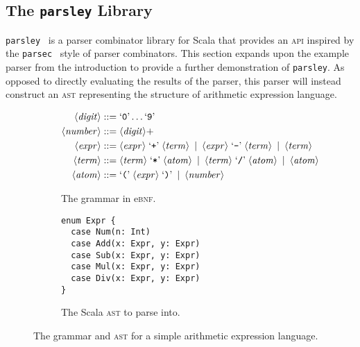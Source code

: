 \documentclass[../../main.tex]{subfiles}
\begin{document}
\subsection{The \texttt{parsley} Library}
\texttt{parsley}~\cite{willis_garnishing_2018} is a parser combinator library for Scala that provides an \textsc{api} inspired by the \texttt{parsec}~\cite{leijen_parsec_2001} style of parser combinators.
This section expands upon the example parser from the introduction to provide a further demonstration of \texttt{parsley}.
As opposed to directly evaluating the results of the parser, this parser will instead construct an \textsc{ast} representing the structure of arithmetic expression language.

\begin{figure}[htbp]
\centering
\begin{subfigure}{0.575\textwidth}
\vspace{3ex}
\centering
\begin{align*}
\langle \mathit{digit} \rangle &::= \text{`\texttt{0}'} \ldots \text{`\texttt{9}'} \\
\langle \mathit{number} \rangle &::= \langle \mathit{digit} \rangle+ \\
\langle \mathit{expr} \rangle &::= \langle \mathit{expr} \rangle \; \text{`\texttt{+}'} \; \langle \mathit{term} \rangle \enspace | \enspace \langle \mathit{expr} \rangle \; \text{`\texttt{-}'} \; \langle \mathit{term} \rangle \enspace | \enspace \langle \mathit{term} \rangle \\
\langle \mathit{term} \rangle &::= \langle \mathit{term} \rangle \; \text{`\texttt{*}'} \; \langle \mathit{atom} \rangle \enspace | \enspace \langle \mathit{term} \rangle \; \text{`\texttt{/}'} \; \langle \mathit{atom} \rangle \enspace | \enspace \langle \mathit{atom} \rangle \\
\langle \mathit{atom} \rangle &::= \text{`\texttt{(}'} \; \langle \mathit{expr} \rangle \; \text{`\texttt{)}'} \enspace | \enspace \langle \mathit{number} \rangle \\
\end{align*}
\caption{The grammar in e\textsc{bnf}.}
\label{fig:simple-grammar-ebnf}
\end{subfigure}
\hfill
\begin{subfigure}{0.325\textwidth}
\vspace{5ex}
\centering
\begin{verbatim}
enum Expr {
  case Num(n: Int)
  case Add(x: Expr, y: Expr)
  case Sub(x: Expr, y: Expr)
  case Mul(x: Expr, y: Expr)
  case Div(x: Expr, y: Expr)
}
\end{verbatim}
\caption{The Scala \textsc{ast} to parse into.}
\label{fig:simple-grammar-ast}
\end{subfigure}
\caption{The grammar and \textsc{ast} for a simple arithmetic expression language.}
\end{figure}
\end{document}

